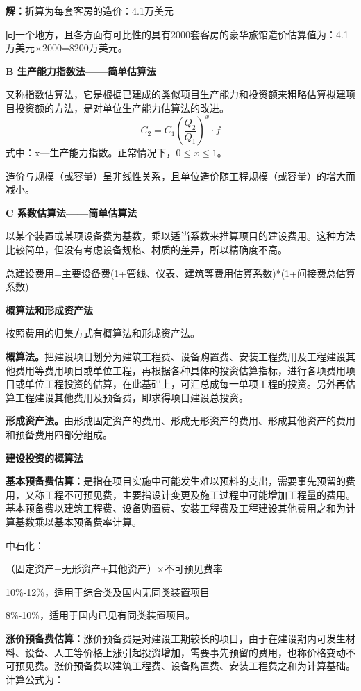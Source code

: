 \textbf{解：}折算为每套客房的造价：4.1万美元

同一个地方，且各方面有可比性的具有2000套客房的豪华旅馆造价估算值为：4.1万美元×2000=8200万美元。

\noindent \textbf{B 生产能力指数法——简单估算法}

又称指数估算法，它是根据已建成的类似项目生产能力和投资额来粗略估算拟建项目投资额的方法，是对单位生产能力估算法的改进。
$$C_2=C_1(\frac{Q_2}{Q_1})^x \cdot f$$
式中：x—生产能力指数。正常情况下，$0 \leq x \leq 1$。

造价与规模（或容量）呈非线性关系，且单位造价随工程规模（或容量）的增大而减小。

\noindent \textbf{C 系数估算法——简单估算法}

以某个装置或某项设备费为基数，乘以适当系数来推算项目的建设费用。这种方法比较简单，但没有考虑设备规格、材质的差异，所以精确度不高。

总建设费用=主要设备费(1+管线、仪表、建筑等费用估算系数)*(1+间接费总估算系数)

\noindent \textbf{概算法和形成资产法}

按照费用的归集方式有概算法和形成资产法。

\textbf{概算法。}把建设项目划分为建筑工程费、设备购置费、安装工程费用及工程建设其他费用等费用项目或单位工程，再根据各种具体的投资估算指标，进行各项费用项目或单位工程投资的估算，在此基础上，可汇总成每一单项工程的投资。另外再估算工程建设其他费用及预备费，即求得项目建设总投资。

\textbf{形成资产法。}由形成固定资产的费用、形成无形资产的费用、形成其他资产的费用和预备费用四部分组成。

\noindent \textbf{建设投资的概算法}

\textbf{基本预备费估算：}是指在项目实施中可能发生难以预料的支出，需要事先预留的费用，又称工程不可预见费，主要指设计变更及施工过程中可能增加工程量的费用。基本预备费以建筑工程费、设备购置费、安装工程费及工程建设其他费用之和为计算基数乘以基本预备费率计算。

中石化：

（固定资产+无形资产+其他资产）$\times $不可预见费率

10\%-12\%，适用于综合类及国内无同类装置项目

8\%-10\%，适用于国内已见有同类装置项目。

\textbf{涨价预备费估算：}涨价预备费是对建设工期较长的项目，由于在建设期内可发生材料、设备、人工等价格上涨引起投资增加，需要事先预留的费用，也称价格变动不可预见费。涨价预备费以建筑工程费、设备购置费、安装工程费之和为计算基础。计算公式为：

